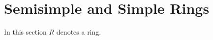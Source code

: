 \section{Semisimple and Simple Rings}


\begin{conventions}
  In this section $R$ denotes a ring.
\end{conventions}






















